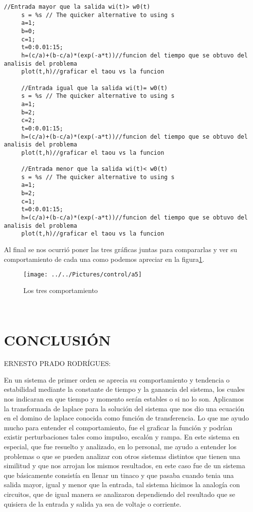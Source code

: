 \documentclass{article}
\begin{document}
\begin{lstlisting}[frame=single]
     //Entrada mayor que la salida wi(t)> w0(t)
     s = %s // The quicker alternative to using s
     a=1;  
     b=0;
     c=1;
     t=0:0.01:15;
     h=(c/a)+(b-c/a)*(exp(-a*t))//funcion del tiempo que se obtuvo del analisis del problema
     plot(t,h)//graficar el taou vs la funcion
 
     //Entrada igual que la salida wi(t)= w0(t)
     s = %s // The quicker alternative to using s
     a=1;  
     b=2;
     c=2;
     t=0:0.01:15;
     h=(c/a)+(b-c/a)*(exp(-a*t))//funcion del tiempo que se obtuvo del analisis del problema
     plot(t,h)//graficar el taou vs la funcion

     //Entrada menor que la salida wi(t)< w0(t)
     s = %s // The quicker alternative to using s
     a=1;  
     b=2;
     c=1;
     t=0:0.01:15;
     h=(c/a)+(b-c/a)*(exp(-a*t))//funcion del tiempo que se obtuvo del analisis del problema
     plot(t,h)//graficar el taou vs la funcion
\end{lstlisting}
Al final se nos ocurrió poner las tres gráficas juntas para compararlas y ver su comportamiento de cada una como podemos apreciar en la figura\ref{fig:../../Pictures/control/a5}.
\begin{figure}[h!]
	\centering
\texttt{[image: ../../Pictures/control/a5]}
	\caption{Los tres comportamiento}
	\label{fig:../../Pictures/control/a5}
\end{figure}\\

\newpage\section{CONCLUSIÓN}
ERNESTO PRADO RODRÍGUES:

En un sistema de primer orden se aprecia su comportamiento y tendencia o estabilidad mediante la constante de tiempo y la ganancia del sistema, los cuales nos indicaran en que tiempo y momento serán estables o si no lo son.
Aplicamos la transformada de laplace para la solución del sistema que nos dio una ecuación en el domino de laplace conocida como función de transferencia. Lo que me ayudo mucho para entender el comportamiento, fue el graficar la función y podrían existir perturbaciones tales como impulso, escalón y rampa.
En este sistema en especial, que fue resuelto y analizado, en lo personal, me ayudo a entender los problemas o que se pueden analizar con otros sistemas distintos que tienen una similitud y que nos arrojan los mismos resultados, en este caso fue de un sistema que básicamente consistía en llenar un tinaco y que pasaba cuando tenia una salida mayor, igual y menor que la entrada, tal sistema hicimos la analogía con circuitos, que de igual manera se analizaron dependiendo del resultado que se quisiera de la entrada y salida ya sea de voltaje o corriente.
\end{document}
